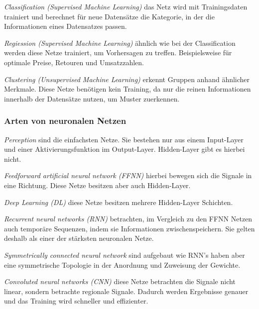 \textit{Classification (Supervised Machine Learning)} das Netz wird mit Trainingsdaten trainiert und berechnet für neue Datensätze die Kategorie, in der die Informationen eines Datensatzes passen.\vspace{0.2cm}

\textit{Regiession (Supervised Machine Learning)} ähnlich wie bei der Classification werden diese Netze trainiert, um Vorhersagen zu treffen. Beispielsweise für optimale Preise, Retouren und Umsatzzahlen.\vspace{0.2cm}

\textit{Clustering (Unsupervised Machine Learning)} erkennt Gruppen anhand ähnlicher Merkmale. Diese Netze benötigen kein Training, da nur die reinen Informationen innerhalb der Datensätze nutzen, um Muster zuerkennen.

\subsubsection{Arten von neuronalen Netzen}
\textit{Perception} sind die einfachsten Netze. Sie bestehen nur aus einem Input-Layer und einer Aktivierungsfunktion im Output-Layer. Hidden-Layer gibt es hierbei nicht.\vspace{0.2cm}

\textit{Feedforward artificial neural network (FFNN)} hierbei bewegen sich die Signale in eine Richtung. Diese Netze besitzen aber auch Hidden-Layer.\vspace{0.2cm}

\textit{Deep Learning (DL)} diese Netze besitzen mehrere Hidden-Layer Schichten.\vspace{0.2cm}

\textit{Recurrent neural networks (RNN)} betrachten, im Vergleich zu den FFNN Netzen auch temporäre Sequenzen, indem sie Informationen zwischenspeichern. Sie gelten deshalb als einer der stärksten neuronalen Netze.\vspace{0.2cm}

\textit{Symmetrically connected neural network} sind aufgebaut wie RNN’s haben aber eine symmetrische Topologie in der Anordnung und Zuweisung der Gewichte.\vspace{0.2cm}

\textit{Convoluted neural networks (CNN)} diese Netze betrachten die Signale nicht linear, sondern betrachte regionale Signale. Dadurch werden Ergebnisse genauer und das Training wird schneller und effizienter.\vspace{0.2cm}

